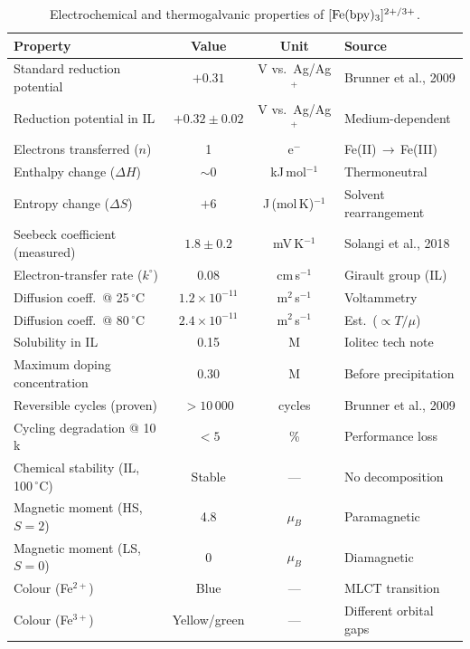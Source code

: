 \documentclass[11pt,a4paper]{article}
\begin{document}
\begin{table}[htbp]
\centering
\caption{Electrochemical and thermogalvanic properties of $[\ce{Fe(bpy)3}]^{2+/3+}$.}
\label{tab:redox_props}
\small
\begin{tabular}{@{}lccl@{}}
\toprule
\rowcolor{lightblue}
\textbf{Property} & \textbf{Value} & \textbf{Unit} & \textbf{Source} \\
\midrule
Standard reduction potential   & $+0.31$             & V vs.\ Ag/Ag$^+$  & Brunner et al., 2009 \\
Reduction potential in IL      & $+0.32\pm0.02$      & V vs.\ Ag/Ag$^+$  & Medium-dependent \\
Electrons transferred ($n$)    & 1                   & e$^-$             & Fe(II)\,$\to$\,Fe(III) \\
Enthalpy change ($\Delta H$)   & $\sim$0             & kJ\,mol$^{-1}$    & Thermoneutral \\
Entropy change ($\Delta S$)    & $+6$                & J\,(mol\,K)$^{-1}$& Solvent rearrangement \\
Seebeck coefficient (measured) & $1.8\pm0.2$         & mV\,K$^{-1}$      & Solangi et al., 2018 \\
Electron-transfer rate ($k^\circ$) & 0.08              & cm\,s$^{-1}$      & Girault group (IL) \\
Diffusion coeff.\ @ 25\,$^\circ$C  & $1.2\times10^{-11}$ & m$^2$\,s$^{-1}$   & Voltammetry \\
Diffusion coeff.\ @ 80\,$^\circ$C  & $2.4\times10^{-11}$ & m$^2$\,s$^{-1}$   & Est.\ ($\propto T/\mu$) \\
Solubility in IL               & 0.15                & M                 & Iolitec tech note \\
Maximum doping concentration   & 0.30                & M                 & Before precipitation \\
Reversible cycles (proven)     & $>10\,000$          & cycles            & Brunner et al., 2009 \\
Cycling degradation @ 10\,k    & $<5$                & \%                & Performance loss \\
Chemical stability (IL, 100\,$^\circ$C) & Stable         & ---               & No decomposition \\
Magnetic moment (HS, $S=2$)    & 4.8                 & $\mu_B$           & Paramagnetic \\
Magnetic moment (LS, $S=0$)    & 0                   & $\mu_B$           & Diamagnetic \\
Colour (Fe$^{2+}$)             & Blue                & ---               & MLCT transition \\
Colour (Fe$^{3+}$)             & Yellow/green        & ---               & Different orbital gaps \\
\bottomrule
\end{tabular}
\end{table}
\end{document}
